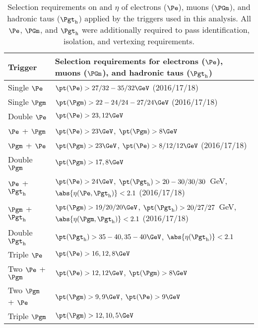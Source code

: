 \begin{table}[!h]
\begin{center}
\begin{tabular}{|l|l|}

\hline
Trigger            & Selection requirements for electrons ($\Pe$), muons ($\PGm$), and hadronic taus ($\tauh$) \\
\hline
Single $\Pe$       & $\pt(\Pe) > 27 / 32 - 35 / 32\GeV$ (2016/17/18) \\
Single $\Pgm$      & $\pt(\Pgm) > 22 - 24 / 24 - 27 / 24\GeV$ (2016/17/18) \\ 
\hline
Double $\Pe$       & $\pt(\Pe) > 23, 12\GeV$ \\
$\Pe$ + $\Pgm$     & $\pt(\Pe) > 23\GeV$, $\pt(\Pgm) > 8\GeV$ \\
$\Pgm$ + $\Pe$     & $\pt(\Pgm) > 23\GeV$, $\pt(\Pe) > 8 / 12 / 12\GeV$ (2016/17/18) \\
Double $\Pgm$      & $\pt(\Pgm) > 17, 8\GeV$ \\
$\Pe$ + $\tauh$    & $\pt(\Pe) > 24\GeV$, $\pt(\tauh) > 20 - 30 / 30 / 30$~GeV, $\abs{\eta(\Pe, \tauh)} < 2.1$ (2016/17/18) \\
$\Pgm$ + $\tauh$   & $\pt(\Pgm) > 19 / 20 / 20\GeV$, $\pt(\tauh) > 20 / 27 / 27$~GeV, $\abs{\eta(\Pgm, \tauh)} < 2.1$ (2016/17/18) \\
Double $\tauh$     & $\pt(\tauh) > 35 - 40, 35 - 40\GeV$, $\abs{\eta(\tauh)} < 2.1$  \\
\hline
Triple $\Pe$       & $\pt(\Pe) > 16, 12, 8\GeV$ \\
Two $\Pe$ + $\Pgm$ & $\pt(\Pe) > 12, 12\GeV$, $\pt(\Pgm) > 8\GeV$ \\
Two $\Pgm$ + $\Pe$ & $\pt(\Pgm) > 9, 9\GeV$, $\pt(\Pe) > 9\GeV$ \\
Triple $\Pgm$      & $\pt(\Pgm) > 12, 10, 5\GeV$ \\
\hline

\end{tabular}
\end{center}
\caption{
  Selection requirements on \pt and $\eta$ of electrons ($\Pe$), muons ($\PGm$), and hadronic taus ($\tauh$)
  applied by the triggers used in this analysis.  All
  $\Pe$, $\PGm$, and $\tauh$ were additionally required to pass identification, isolation, and vertexing requirements.
}
\label{tab:triggers}
\end{table}



